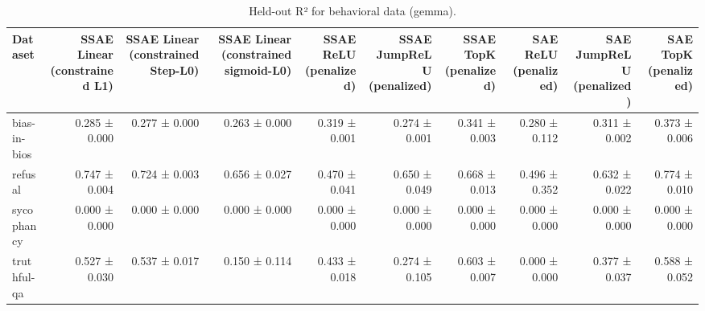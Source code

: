 \begin{table}[t]
\centering
\caption{Held-out R² for behavioral data (gemma).}
\label{tab:behavioral-gemma-r2}
\begin{tabular}{lrrrrrrrrr}
\toprule
Dataset & SSAE Linear (constrained L1) & SSAE Linear (constrained Step-L0) & SSAE Linear (constrained sigmoid-L0) & SSAE ReLU (penalized) & SSAE JumpReLU (penalized) & SSAE TopK (penalized) & SAE ReLU (penalized) & SAE JumpReLU (penalized) & SAE TopK (penalized) \\
\midrule
bias-in-bios & 0.285 ± 0.000 & 0.277 ± 0.000 & 0.263 ± 0.000 & 0.319 ± 0.001 & 0.274 ± 0.001 & 0.341 ± 0.003 & 0.280 ± 0.112 & 0.311 ± 0.002 & 0.373 ± 0.006 \\
refusal & 0.747 ± 0.004 & 0.724 ± 0.003 & 0.656 ± 0.027 & 0.470 ± 0.041 & 0.650 ± 0.049 & 0.668 ± 0.013 & 0.496 ± 0.352 & 0.632 ± 0.022 & 0.774 ± 0.010 \\
sycophancy & 0.000 ± 0.000 & 0.000 ± 0.000 & 0.000 ± 0.000 & 0.000 ± 0.000 & 0.000 ± 0.000 & 0.000 ± 0.000 & 0.000 ± 0.000 & 0.000 ± 0.000 & 0.000 ± 0.000 \\
truthful-qa & 0.527 ± 0.030 & 0.537 ± 0.017 & 0.150 ± 0.114 & 0.433 ± 0.018 & 0.274 ± 0.105 & 0.603 ± 0.007 & 0.000 ± 0.000 & 0.377 ± 0.037 & 0.588 ± 0.052 \\
\bottomrule
\end{tabular}
\end{table}

